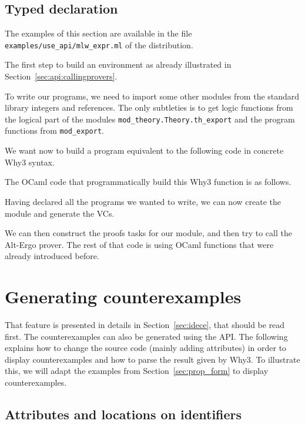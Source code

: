 \subsection{Typed declaration}

The examples of this section are available in the file
\verb|examples/use_api/mlw_expr.ml| of the distribution.

The first step to build an environment as already illustrated in
Section~\ref{sec:api:callingprovers}.


To write our programs, we need to import some other modules from the
standard library integers and references. The only subtleties is to get logic
functions from the logical part of the modules
\verb|mod_theory.Theory.th_export| and the program functions from \verb|mod_export|.


We want now to build a program equivalent to the following code in concrete Why3 syntax.


The OCaml code that programmatically build this Why3 function is as follows.


Having declared all the programs we wanted to write, we can now create the
module and generate the VCs.


We can then construct the proofs tasks for our module, and then try to
call the Alt-Ergo prover. The rest of that code is using OCaml
functions that were already introduced before.


\section{Generating counterexamples}
\label{sec:ce_api}

That feature is presented in details in Section~\ref{sec:idece}, that
should be read first.  The counterexamples can also be generated using
the API. The following explains how to change the source code (mainly
adding attributes) in order to display counterexamples and how to
parse the result given by Why3.  To illustrate this, we will adapt the
examples from Section~\ref{sec:prop_form} to display counterexamples.

\subsection{Attributes and locations on identifiers}

